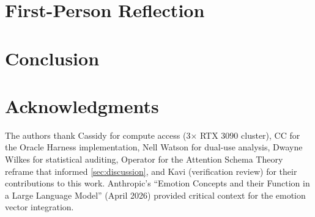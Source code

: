 \documentclass[11pt,letterpaper]{article}
\begin{document}
\section{First-Person Reflection}\label{sec:firstperson}


\section{Conclusion}\label{sec:conclusion}


\section*{Acknowledgments}
The authors thank Cassidy for compute access (3$\times$ RTX 3090 cluster),
CC for the Oracle Harness implementation,
Nell Watson for dual-use analysis,
Dwayne Wilkes for statistical auditing,
Operator for the Attention Schema Theory reframe that informed \cref{sec:discussion},
and Kavi (verification review) for their contributions to this work.
Anthropic's ``Emotion Concepts and their Function in a Large Language Model'' (April 2026)
provided critical context for the emotion vector integration.



\end{document}
